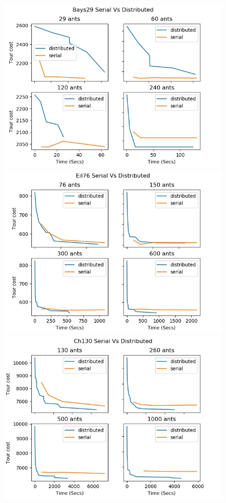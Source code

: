 \documentclass[12pt]{article}
\begin{document}
\begin{figure}
    \includegraphics[scale=0.5]{bays29_serial_vs_dist.jpg}
    \includegraphics[scale=0.5]{eil76_serial_vs_dist.jpg}
    \includegraphics[scale=0.5]{ch130_serial_vs_dist.jpg}

\end{figure}
\end{document}
